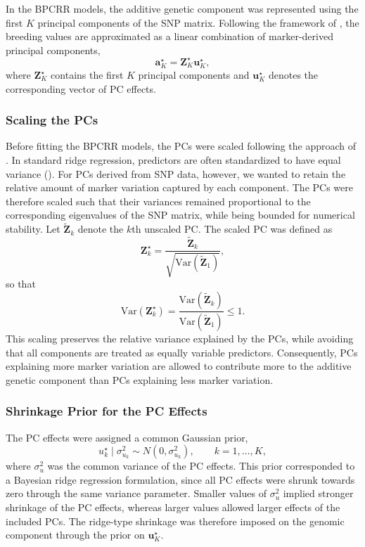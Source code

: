 In the BPCRR models, the additive genetic component was represented using the first $K$ principal components of the SNP matrix. Following the framework of \textcite{aspheim_flexible_2026}, the breeding values are approximated as a linear combination of marker-derived principal components,
%
\begin{equation}
\mathbf{a}_K^\star = \mathbf{Z}_K^\star \boldsymbol{u}_K^\star ,
\label{eq:PC_representation}
\end{equation}
%
where $\mathbf{Z}_K^\star$ contains the first $K$ principal components and $\boldsymbol{u}_K^\star$ denotes the corresponding vector of PC effects. 

\subsubsection*{Scaling the PCs}
Before fitting the BPCRR models, the PCs were scaled following the approach of 
\textcite{aspheim_flexible_2026}. In standard ridge regression, predictors are often standardized to have equal variance (\cite{gianola_priors_2013, aspheim_flexible_2026}). For PCs derived from SNP data, however, we wanted to retain the relative amount of marker variation captured by each component. The PCs were therefore scaled such that their variances remained proportional to the corresponding eigenvalues of the SNP matrix, while being bounded for numerical stability. Let $\tilde{\mathbf{Z}}_k$ denote the $k$th unscaled PC. The scaled PC was defined as
%
\[
\mathbf{Z}_k^\star =
\frac{\tilde{\mathbf{Z}}_k}
{\sqrt{\mathrm{Var}(\tilde{\mathbf{Z}}_1)}} ,
\]
%
so that
%
\[
\mathrm{Var}(\mathbf{Z}_k^\star)
=
\frac{\mathrm{Var}(\tilde{\mathbf{Z}}_k)}
{\mathrm{Var}(\tilde{\mathbf{Z}}_1)}
\leq 1 .
\]
%
This scaling preserves the relative variance explained by the PCs, while avoiding that all components are treated as equally variable predictors. Consequently, PCs explaining more marker variation are allowed to contribute more to the additive genetic component than PCs explaining less marker variation.

\subsubsection*{Shrinkage Prior for the PC Effects }
The PC effects were assigned a common Gaussian prior,
%
\[
u_k^\star \mid \sigma_{u_k}^2 \sim N(0, \sigma_{u_k}^2),
\qquad k = 1,\ldots,K ,
\]
%
where $\sigma_u^2$ was the common variance of the PC effects. This prior corresponded to a Bayesian ridge regression formulation, since all PC effects were shrunk towards zero through the same variance parameter. Smaller values of $\sigma_u^2$ implied stronger shrinkage of the PC effects, whereas larger values allowed larger effects of the included PCs. The ridge-type shrinkage was therefore imposed on the genomic component through the prior on $\boldsymbol{u}_K^\star$.

